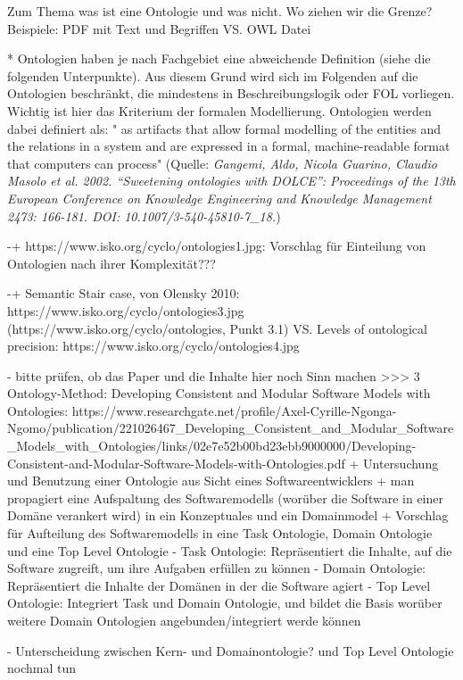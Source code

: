 \documentclass{article}
\begin{document}
Zum Thema was ist eine Ontologie und was nicht. Wo ziehen wir die Grenze? Beispiele: PDF mit Text und Begriffen VS. OWL Datei

* Ontologien haben je nach Fachgebiet eine abweichende Definition (siehe die folgenden Unterpunkte). Aus diesem Grund wird sich im Folgenden auf die Ontologien beschränkt, die mindestens in Beschreibungslogik oder FOL vorliegen. Wichtig ist hier das Kriterium der formalen Modellierung. Ontologien werden dabei definiert als: " as artifacts that allow formal modelling of the entities and the relations in a system and are expressed in a formal, machine-readable format that computers can process" (Quelle: \textit{Gangemi, Aldo, Nicola Guarino, Claudio Masolo et al. 2002. “Sweetening ontologies with DOLCE”: Proceedings of the 13th European Conference on Knowledge Engineering and Knowledge Management 2473: 166-181. DOI: 10.1007/3-540-45810-7\_18.})

-+ https://www.isko.org/cyclo/ontologies1.jpg: Vorschlag für Einteilung von Ontologien nach ihrer Komplexität???

-+ Semantic Stair case, von Olensky 2010: https://www.isko.org/cyclo/ontologies3.jpg (https://www.isko.org/cyclo/ontologies, Punkt 3.1) VS. Levels of ontological precision: https://www.isko.org/cyclo/ontologies4.jpg



- bitte prüfen, ob das Paper und die Inhalte hier noch Sinn machen >>> 3  Ontology-Method: Developing Consistent and Modular Software Models with Ontologies:  https://www.researchgate.net/profile/Axel-Cyrille-Ngonga-Ngomo/publication/221026467\_Developing\_Consistent\_and\_Modular\_Software\_Models\_with\_Ontologies/links/02e7e52b00bd23ebb9000000/Developing-Consistent-and-Modular-Software-Models-with-Ontologies.pdf
 + Untersuchung und Benutzung einer Ontologie aus Sicht eines Softwareentwicklers
 + man propagiert eine Aufspaltung des Softwaremodells (worüber die Software in einer Domäne verankert wird) in ein Konzeptuales und ein Domainmodel
 + Vorschlag für Aufteilung des Softwaremodells in eine Task Ontologie, Domain Ontologie und eine Top Level Ontologie
   - Task Ontologie: Repräsentiert die Inhalte, auf die Software zugreift, um ihre Aufgaben erfüllen zu können
   - Domain Ontologie: Repräsentiert die Inhalte der Domänen in der die Software agiert
   - Top Level Ontologie: Integriert Task und Domain Ontologie, und bildet die Basis worüber weitere Domain Ontologien angebunden/integriert werde können

- Unterscheidung zwischen Kern- und Domainontologie? und Top Level Ontologie nochmal tun
\end{document}

